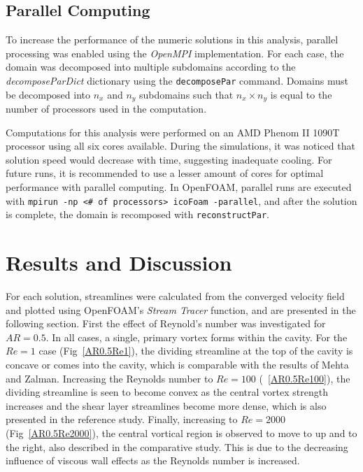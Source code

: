 \documentclass[twocolumn,10pt]{asme2ej}
\begin{document}
\subsection{Parallel Computing}

To increase the performance of the numeric solutions in this analysis, parallel processing was enabled using the \emph{OpenMPI} implementation.  For each case, the domain was decomposed into multiple subdomains according to the \emph{decomposeParDict} dictionary using the \texttt{decomposePar} command.  Domains must be decomposed into $n_x$ and $n_y$ subdomains such that $n_x\times n_y$ is equal to the number of processors used in the computation.

Computations for this analysis were performed on an AMD Phenom II 1090T processor using all six cores available.  During the simulations, it was noticed that solution speed would decrease with time, suggesting inadequate cooling.  For future runs, it is recommended to use a lesser amount of cores for optimal performance with parallel computing.  In OpenFOAM, parallel runs are executed with \texttt{mpirun -np <\# of processors> icoFoam -parallel}, and after the solution is complete, the domain is recomposed with \texttt{reconstructPar}.

\section{Results and Discussion}

For each solution, streamlines were calculated from the converged velocity field and plotted using OpenFOAM’s \emph{Stream Tracer} function, and are presented in the following section.  First the effect of Reynold’s number was investigated for $AR=0.5$.  In all cases, a single, primary vortex forms within the cavity.  For the $Re=1$ case (Fig~\ref{AR0.5Re1}), the dividing streamline at the top of the cavity is concave or comes into the cavity, which is comparable with the results of Mehta and Zalman.  Increasing the Reynolds number to $Re=100$ (~\ref{AR0.5Re100}), the dividing streamline is seen to become convex as the central vortex strength increases and the shear layer streamlines become more dense, which is also presented in the reference study.  Finally, increasing to $Re=2000$ (Fig~\ref{AR0.5Re2000}), the central vortical region is observed to move to up and to the right, also described in the comparative study.  This is due to the decreasing influence of viscous wall effects as the Reynolds number is increased.
\end{document}
